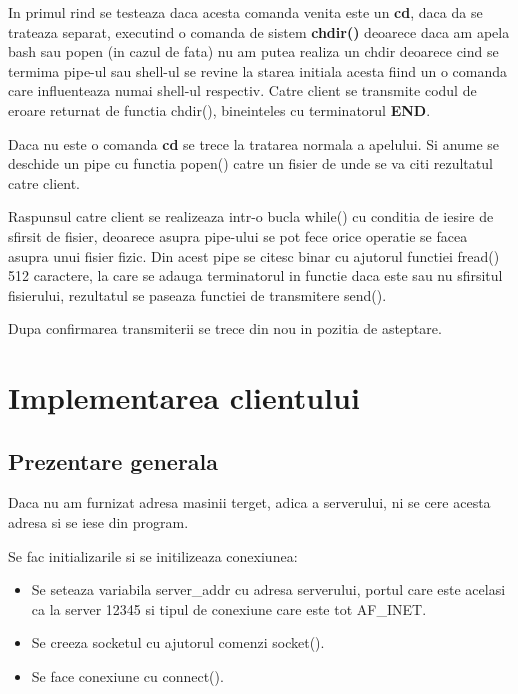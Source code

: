 \documentclass{report}
\begin{document}
In primul rind se testeaza daca acesta comanda venita este un \textbf{cd},
daca da se trateaza separat, executind o comanda de sistem \textbf{chdir()}
deoarece daca am apela bash sau popen (in cazul de fata) nu am putea realiza
un chdir deoarece cind se termima pipe-ul sau shell-ul se revine la starea
initiala acesta fiind un o comanda care influenteaza numai shell-ul
respectiv. Catre client se transmite codul de eroare returnat de functia
chdir(), bineinteles cu terminatorul \textbf{END}.

Daca nu este o comanda \textbf{cd} se trece la tratarea normala a apelului.
Si anume se deschide un pipe cu functia popen() catre un fisier de unde se
va citi rezultatul catre client.

Raspunsul catre client se realizeaza intr-o bucla while() cu conditia de
iesire de sfirsit de fisier, deoarece asupra pipe-ului se pot fece orice
operatie se facea asupra unui fisier fizic. Din acest pipe se citesc binar
cu ajutorul functiei fread() 512 caractere, la care se adauga terminatorul
in functie daca este sau nu sfirsitul fisierului, rezultatul se paseaza
functiei de transmitere send().

Dupa confirmarea transmiterii se trece din nou in pozitia de asteptare.

\section{Implementarea clientului}

\subsection{Prezentare generala}

\hspace{5mm}Daca nu am furnizat adresa masinii terget, adica a serverului,
ni se cere acesta adresa si se iese din program.

Se fac initializarile si se initilizeaza conexiunea:

\begin{itemize}
\item  Se seteaza variabila server\_addr cu adresa serverului, portul care
este acelasi ca la server 12345 si tipul de conexiune care este tot AF\_INET.

\item  Se creeza socketul cu ajutorul comenzi socket().

\item  Se face conexiune cu connect().
\end{itemize}
\end{document}
